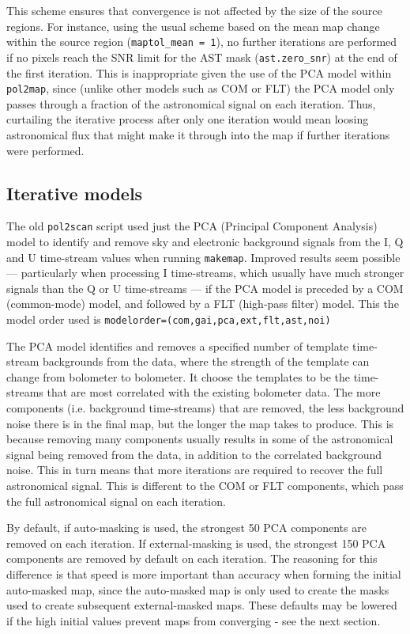 \documentclass[twoside,11pt]{starlink}
\begin{document}
This scheme ensures that convergence is not affected by the size of the
source regions. For instance, using the usual scheme based on the mean
map change within the source region (\texttt{maptol\_mean = 1}), no further
iterations are performed if no pixels reach the SNR limit for the AST mask
(\texttt{ast.zero\_snr}) at the end of the first iteration. This
is inappropriate given the use of the PCA model within \texttt{pol2map},
since (unlike other models such as COM or FLT) the PCA model only passes
through a fraction of the astronomical signal on each iteration. Thus,
curtailing the iterative process after only one iteration would mean loosing
astronomical flux that might make it through into the map if further
iterations were performed.

\subsection{Iterative models}

The old \texttt{pol2scan} script used just the PCA (Principal Component
Analysis) model to identify and remove sky and electronic background
signals from the I, Q and U time-stream values when running
\texttt{makemap}. Improved results seem possible --- particularly when
processing I time-streams, which usually have much stronger signals than the
Q or U time-streams --- if the PCA model is preceded by a COM
(common-mode) model, and followed by a FLT (high-pass filter) model. This
the model order used is \texttt{modelorder=(com,gai,pca,ext,flt,ast,noi)}

The PCA model identifies and removes a specified number of template
time-stream backgrounds from the data, where the strength of the template
can change from bolometer to bolometer. It choose the templates to be the
time-streams that are most correlated with the existing bolometer data.
The more components (i.e. background time-streams) that are removed, the
less background noise there is in the final map, but the longer the map
takes to produce. This is because removing many components usually
results in some of the astronomical signal being removed from the data, in
addition to the correlated background noise. This in turn means that more
iterations are required to recover the full astronomical signal. This is
different to the COM or FLT components, which pass the full astronomical
signal on each iteration.

By default, if auto-masking is used, the strongest 50 PCA components are
removed on each iteration. If external-masking is used, the strongest 150
PCA components are removed by default on each iteration. The reasoning
for this difference is that speed is more important than accuracy when
forming the initial auto-masked map, since the auto-masked map is only
used to create the masks used to create subsequent external-masked maps.
These defaults may be lowered if the high initial values prevent maps
from converging - see the next section.
\end{document}
